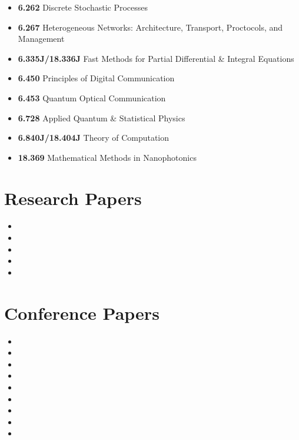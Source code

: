 \documentclass[letterpaper,12pt]{article}
\begin{document}
\begin{itemize}

\item \textbf{6.262} Discrete Stochastic Processes
\item \textbf{6.267} Heterogeneous Networks: Architecture, Transport, Proctocols, and Management
\item \textbf{6.335J/18.336J} Fast Methods for Partial Differential \& Integral Equations
\item \textbf{6.450} Principles of Digital Communication
\item \textbf{6.453} Quantum Optical Communication
\item \textbf{6.728} Applied Quantum \& Statistical Physics
\item \textbf{6.840J/18.404J} Theory of Computation 
\item \textbf{18.369} Mathematical Methods in Nanophotonics

\end{itemize}

\section{Research Papers}

\begin{itemize}
\item {}
\item {}
\item {}
\item {}
\item {}
\end{itemize}

\section{Conference Papers}

\begin{itemize}
\item {}
\item {}
\item {}
\item {}
\item {}
\item {}
\item {}
\item {}
\item {}
\end{itemize}
\end{document}
